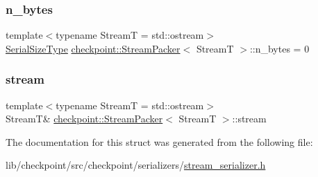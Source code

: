\subsubsection{\texorpdfstring{n\+\_\+bytes}{n\_bytes}}
{\footnotesize\ttfamily template$<$typename StreamT  = std\+::ostream$>$ \\
\hyperlink{namespacecheckpoint_a083f6674da3f94c2901b18c6d238217c}{Serial\+Size\+Type} \hyperlink{structcheckpoint_1_1_stream_packer}{checkpoint\+::\+Stream\+Packer}$<$ StreamT $>$\+::n\+\_\+bytes = 0\hspace{0.3cm}{\ttfamily [private]}}

\mbox{\label{structcheckpoint_1_1_stream_packer_aa5b89dd441e15eb18b8ab65b0b39f471}} 
\subsubsection{\texorpdfstring{stream}{stream}}
{\footnotesize\ttfamily template$<$typename StreamT  = std\+::ostream$>$ \\
StreamT\& \hyperlink{structcheckpoint_1_1_stream_packer}{checkpoint\+::\+Stream\+Packer}$<$ StreamT $>$\+::stream\hspace{0.3cm}{\ttfamily [private]}}



The documentation for this struct was generated from the following file\+:\begin{DoxyCompactItemize}
\item 
lib/checkpoint/src/checkpoint/serializers/\hyperlink{stream__serializer_8h}{stream\+\_\+serializer.\+h}\end{DoxyCompactItemize}

